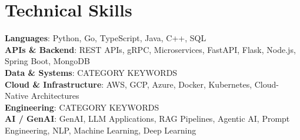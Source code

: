 \documentclass[letterpaper,10.5pt]{article}
\begin{document}
\section{Technical Skills}
 \begin{itemize}[leftmargin=0.12in, label={}]
    \small{\item{

     \textbf{Languages}{: Python, Go, TypeScript, Java, C++, SQL} \\[2pt]

     \textbf{APIs \& Backend}{: REST APIs, gRPC, Microservices, FastAPI, Flask, Node.js, Spring Boot, MongoDB} \\[2pt]

     \textbf{Data \& Systems}{: CATEGORY KEYWORDS} \\[2pt]

     \textbf{Cloud \& Infrastructure}{: AWS, GCP, Azure, Docker, Kubernetes, Cloud-Native Architectures} \\[2pt]

     \textbf{Engineering}{: CATEGORY KEYWORDS} \\[2pt]

     \textbf{AI / GenAI}{: GenAI, LLM Applications, RAG Pipelines, Agentic AI, Prompt Engineering, NLP, Machine Learning, Deep Learning}

    }}
 \end{itemize}

\end{document}
